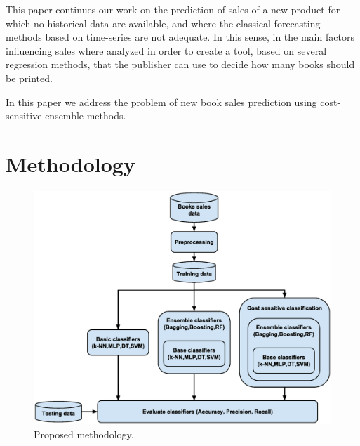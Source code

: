 \documentclass[a4paper,10pt,onecolumn,preprint,3p]{elsarticle}
\begin{document}
This paper continues our work on the prediction of sales of a new product for 
which no historical data are available, and where the classical forecasting methods 
based on time-series are not adequate.
In this sense, in \cite{Castillo2016books} the main factors influencing sales where 
analyzed in order to create a tool, based on several regression methods, that the 
publisher can use to decide how many books should be printed.

In this paper we address the problem of new book sales prediction using cost-sensitive ensemble methods.


\section{Methodology}
\label{sec:methodology}

\begin{figure}[ht]
\begin{center}
\includegraphics[scale=0.40]{books_methodology}
\end{center}
\caption{Proposed methodology.}
\label{fig:methodology}
\end{figure}
\end{document}
